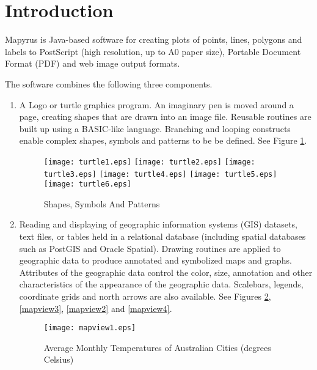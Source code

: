 
\section{Introduction}

Mapyrus is Java-based
software for creating plots of points, lines, polygons and labels 
to PostScript (high resolution, up to A0 paper size),
Portable Document Format (PDF) and web image output formats.

The software combines the following three components.

\begin{enumerate}
\item

A Logo or turtle graphics program.
An imaginary pen is moved around a page,
creating shapes that are drawn into an image file.
Reusable routines are built up using a BASIC-like language.
Branching and looping constructs enable complex shapes, symbols and patterns
to be be defined.  See Figure \ref{turtle}.

\begin{figure}[htb]
\texttt{[image: turtle1.eps]}
\texttt{[image: turtle2.eps]}
\texttt{[image: turtle3.eps]}
\texttt{[image: turtle4.eps]}
\texttt{[image: turtle5.eps]}
\texttt{[image: turtle6.eps]}
\caption{Shapes, Symbols And Patterns}
\label{turtle}
\end{figure}

\item

Reading and displaying of geographic information
systems (GIS) datasets, text files, or tables held in a relational database
(including spatial databases such as PostGIS and Oracle Spatial).
Drawing routines are applied to geographic data to produce annotated and
symbolized maps and graphs.  Attributes of the geographic data control
the color, size, annotation and other characteristics of the
appearance of the geographic data.
Scalebars, legends, coordinate grids and north arrows are also available.
See Figures \ref{mapview1}, \ref{mapview3}, \ref{mapview2} and
\ref{mapview4}.

\begin{figure}
\texttt{[image: mapview1.eps]}
\caption[Average Monthly Temperatures]{Average Monthly Temperatures of Australian Cities (degrees Celsius)}
\label{mapview1}
\end{figure}


\end{enumerate}
